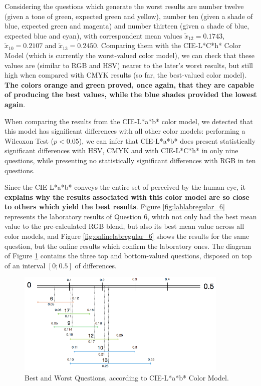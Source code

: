 %
Considering the questions which generate the worst results are number twelve (given a tone of green, expected green and yellow), number ten (given a shade of blue, expected green and magenta) and number thirteen
(given a shade of blue, expected blue and cyan), with correspondent mean values $\tilde{x}_{12} = 0.1743$, $\tilde{x}_{10} = 0.2107$ and $\tilde{x}_{13} = 0.2450$. Comparing them with the CIE-L*C*h* Color Model
(which is currently the worst-valued color model), we can check that these values are (similar to RGB and HSV) nearer to the later's worst results, but still high when compared with CMYK results (so far, the
best-valued color model). \textbf{The colors orange and green proved, once again, that they are capable of producing the best values, while the blue shades provided the lowest again}. \par
%
When comparing the results from the CIE-L*a*b* color model, we detected that this model has significant differences with all other color models: performing a Wilcoxon Test ($p < 0.05$), we can infer that
CIE-L*a*b* does present statistically significant differences with HSV, CMYK and with CIE-L*C*h* in only nine questions, while presenting no statistically significant differences with RGB
in ten questions. \par
%
Since the CIE-L*a*b* conveys the entire set of perceived by the human eye, it \textbf{explains why the results associated with this color model are so close to others which yield the best results}.
Figure \ref{fig:lablabregular_6} represents the laboratory results of Question 6, which not only had the best mean value to the pre-calculated RGB blend, but also its best mean value across all color models,
and Figure \ref{fig:onlinelabregular_6} shows the results for the same question, but the online results which confirm the laboratory ones. The diagram of Figure \ref{fig:lab_analysis} contains the three top and bottom-valued questions, disposed on top of an interval $[0 ; 0.5]$ of differences. \par
%
\begin{figure}[!htbp]
  \centering
  \includegraphics[width=0.9\textwidth]{images/results/lab_questions_analysis.png}
  \caption[Best and Worst Questions, according to CIE-L*a*b* Color Model.]{Best and Worst Questions, according to CIE-L*a*b* Color Model.}
  \label{fig:lab_analysis}
\end{figure}
%
